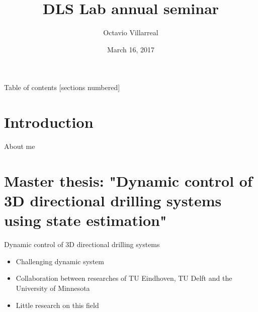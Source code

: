 \documentclass[10pt]{beamer}
\title{DLS Lab annual seminar}
\subtitle{}
\date{March 16, 2017}
\author{Octavio Villarreal}
\institute{Istituto Italiano di Tecnologia}
\begin{document}
\maketitle

\begin{frame}{Table of contents}
  [sections numbered]
  \tableofcontents[hideallsubsections]
\end{frame}

\section{Introduction}
\begin{frame}{About me}

\end{frame}
\section{Master thesis: "Dynamic control of 3D directional drilling systems using state estimation"}

\begin{frame}{Dynamic control of 3D directional drilling systems}
	\begin{itemize}\setlength\itemsep{2.5em}
		\item Challenging dynamic system
		\item Collaboration between researches of TU Eindhoven, TU Delft and the University of Minnesota
		\item Little research on this field
	\end{itemize}
\end{frame}
\end{document}
